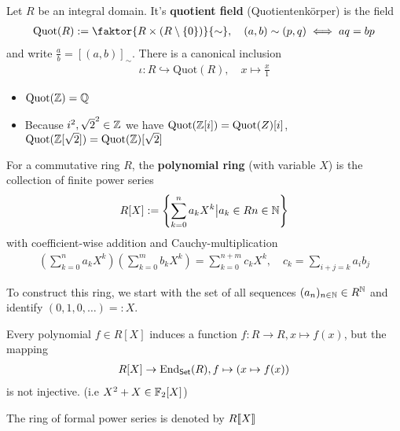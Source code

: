 \begin{dfn}[]
  Let $R$ be an integral domain. It's \textbf{quotient field} (Quotientenkörper) is the field
  \begin{align*}
    \text{Quot}(R) := \faktor{R \times (R \setminus \{0\})}{\sim}, \quad (a,b) \sim (p,q) \iff  aq = bp
  \end{align*}
  and write $\frac{a}{b} = [(a,b)]_{\sim}$.
  There is a canonical inclusion
  \begin{align*}
    \iota: R \hookrightarrow \text{Quot}(R), \quad x \mapsto \frac{x}{1}
  \end{align*}
\end{dfn}

\begin{itemize}
  \item $\text{Quot}(\mathbb{Z}) = \mathbb{Q}$
  \item Because $i^{2}, \sqrt{2}^{2} \in \mathbb{Z}$ we have $\text{Quot}(\mathbb{Z}[i]) = \text{Quot}(Z)[i]$, $\text{Quot}(\mathbb{Z}[\sqrt{2}]) = \text{Quot}(\mathbb{Z})[\sqrt{2}]$
\end{itemize}





\begin{dfn}
  For a commutative ring $R$, the \textbf{polynomial ring} (with variable $X$) is the collection of finite power series
  \begin{align*}
    R[X] := \left\{
      \sum_{k=0}^{n} a_k X^{k} \big\vert a_k \in R n \in \mathbb{N}
    \right\}
  \end{align*}
  with coefficient-wise addition and Cauchy-multiplication
  \begin{align*}
    \left(
      \sum_{k=0}^{n}a_k X^{k}
    \right)
    \left(
      \sum_{k=0}^{m}b_k X^{k}
    \right)
    =
    \sum_{k=0}^{n+m}
    c_k X^{k}
    , \quad c_k = \sum_{i+j = k}a_ib_j
  \end{align*}
\end{dfn}

To construct this ring, we start with the set of all sequences $(a_n)_{n \in \mathbb{N}} \in R^{\mathbb{N}}$ and identify $(0,1,0,\ldots) =: X$.


Every polynomial $f \in R[X]$ induces a function $f:R \to R, x \mapsto  f(x)$, but the mapping
\begin{align*}
  R[X] \to \operatorname{End}_{\text{\sffamily Set}}(R), f \mapsto (x \mapsto f(x))
\end{align*}
is not injective. (i.e $X^{2} + X \in \mathbb{F}_2[X]$)


The ring of formal power series is denoted by $R\llbracket X\rrbracket$


